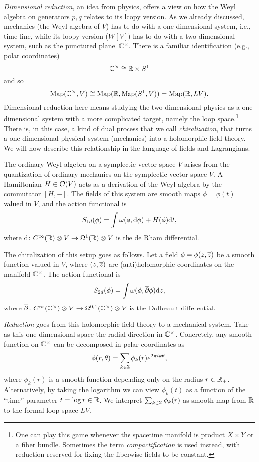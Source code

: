 \documentclass[11pt]{amsart}
\begin{document}
{\it Dimensional reduction}, an idea from physics, offers a view on how the Weyl algebra on generators $p, q$ relates to its loopy version.
As we already discussed, mechanics (the Weyl algebra of $V$) has to do with a one-dimensional system, i.e., time-line, 
while its loopy version ($W[V]$) has to do with a two-dimensional system, such as the punctured plane~$\mathbb C^\times$.
There is a familiar identification (e.g., polar coordinates)
\[
\mathbb C^\times \cong \mathbb R \times S^1
\]
and so
\[
{\rm Map}(\mathbb C^\times,V) \cong {\rm Map}(\mathbb R, {\rm Map}(S^1,V)) = {\rm Map}(\mathbb R, LV).
\]
Dimensional reduction here means studying the two-dimensional physics as a one-dimensional system with a more complicated target, namely the loop space.\footnote{One can play this game whenever the spacetime manifold is product $X \times Y$ or a fiber bundle.
Sometimes the term {\it compactification} is used instead, with reduction reserved for fixing the fiberwise fields to be constant.}
There is, in this case, a kind of dual process that we call {\it chiralization},
that turns a one-dimensional physical system (mechanics) into a holomorphic field theory.
We will now describe this relationship in the language of fields and Lagrangians.

The ordinary Weyl algebra on a symplectic vector space $V$ arises from the quantization of ordinary mechanics on the symplectic vector space $V$.
A Hamiltonian $H \in \mathcal O(V)$ acts as a derivation of the Weyl algebra by the commutator $[H,-]$.
The fields of this system are smooth maps $\phi = \phi(t)$ valued in $V$, 
and the action functional is 
\[
S_{1d} (\phi) = \int \omega(\phi , {\rm d} \phi) + H(\phi) {\rm d} t ,
\]
where ${\rm d} \colon C^\infty(\mathbb R) \otimes V \to \Omega^1(\mathbb R) \otimes V$ is the de Rham differential. 

The chiralization of this setup goes as follows.
Let a field $\phi = \phi(z,{\overline{z}})$ be a smooth function valued in $V$, 
where $(z,{\overline{z}})$ are (anti)holomorphic coordinates on the manifold $\mathbb C^\times$.
The action functional is 
\[
S_{2d}(\phi) = \int \omega(\phi, {\overline{\partial}} \phi) {\rm d} z ,
\]
where ${\overline{\partial}} \colon C^\infty(\mathbb C^\times)\otimes V \to \Omega^{0,1}(\mathbb C^\times) \otimes V$ is the Dolbeault differential.

{\it Reduction} goes from this holomorphic field theory to a mechanical system. 
Take as this one-dimensional space the radial direction in $\mathbb C^\times$.
Concretely, any smooth function on $\mathbb C^\times$ can be decomposed in polar coordinates as
\[
\phi(r,\theta) = \sum_{k \in \mathbb Z} \phi_k(r) e^{2 \pi i k \theta} ,
\]
where $\phi_k(r)$ is a smooth function depending only on the radius $r \in \mathbb R_+$.
Alternatively, by taking the logarithm we can view $\phi_k(t)$ as a function of the ``time'' parameter $t = \log r \in \mathbb R$. 
We interpret $\sum_{k \in \mathbb Z} \phi_k(r)$ as smooth map from $\mathbb R$ to the formal loop space $LV$. 
\end{document}
